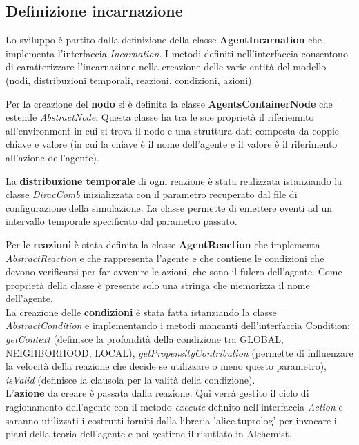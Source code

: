 \documentclass[12pt,a4paper,openright,twoside]{report}
\begin{document}
\subsection{Definizione incarnazione}
Lo sviluppo \`e partito dalla definizione della classe \textbf{AgentIncarnation} che implementa l'interfaccia \textit{Incarnation}. I metodi definiti nell'interfaccia consentono di caratterizzare l'incarnazione nella creazione delle varie entit\`a del modello (nodi, distribuzioni temporali, reazioni, condizioni, azioni).

Per la creazione del \textbf{nodo} si \`e definita la classe \textbf{AgentsContainerNode} che estende \textit{AbstractNode}. Questa classe ha tra le sue propriet\`a il riferiemnto all'environment in cui si trova il nodo e una struttura dati composta da coppie chiave e valore (in cui la chiave \`e il nome dell'agente e il valore \`e il riferimento all'azione dell'agente).

La \textbf{distribuzione temporale} di ogni reazione \`e stata realizzata istanziando la classe \textit{DiracComb} inizializzata con il parametro recuperato dal file di configurazione della simulazione. La classe permette di emettere eventi ad un intervallo temporale specificato dal parametro passato.

Per le \textbf{reazioni} \`e stata definita la classe \textbf{AgentReaction} che implementa \textit{AbstractReaction} e che rappresenta l'agente e che contiene le condizioni che devono verificarsi per far avvenire le azioni, che sono il fulcro dell'agente. Come propriet\`a della classe \`e presente solo una stringa che memorizza il nome dell'agente.
\\
La creazione delle \textbf{condizioni} \`e stata fatta istanziando la classe \textit{AbstractCondition} e implementando i metodi mancanti dell'interfaccia Condition: \textit{getContext} (definisce la profondit\`a della condizione tra GLOBAL, NEIGHBORHOOD, LOCAL), \textit{getPropensityContribution} (permette di influenzare la velocit\`a della reazione che decide se utilizzare o meno questo parametro), \textit{isValid} (definisce la clausola per la valit\`a della condizione).
\\
L'\textbf{azione} da creare \`e passata dalla reazione. Qui verr\`a gestito il ciclo di ragionamento dell'agente con il metodo \textit{execute} definito nell'interfaccia \textit{Action} e saranno utilizzati i costrutti forniti dalla libreria 'alice.tuprolog' per invocare i piani della teoria dell'agente e poi gestirne il risutlato in Alchemist.
\end{document}
